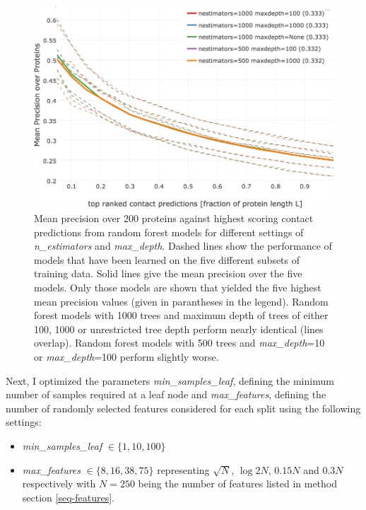 \documentclass[11pt,a4paper,twoside]{book}
\providecommand{\tightlist}{%
  \setlength{\itemsep}{0pt}\setlength{\parskip}{0pt}}
\theoremstyle{definition}
\theoremstyle{definition}
\theoremstyle{remark}
\begin{document}
\begin{figure}

{\centering \includegraphics[width=1\linewidth]{img/random_forest_contact_prior/new_gridsearch/precision_vs_rank_cv_on_test_random_forest_nestimators_maxdepth_top5_notitle} 

}

\caption{Mean precision over
200 proteins against highest scoring contact predictions from random
forest models for different settings of \emph{n\_estimators} and
\emph{max\_depth}. Dashed lines show the performance of models that have
been learned on the five different subsets of training data. Solid lines
give the mean precision over the five models. Only those models are
shown that yielded the five highest mean precision values (given in
parantheses in the legend). Random forest models with 1000 trees and
maximum depth of trees of either 100, 1000 or unrestricted tree depth
perform nearly identical (lines overlap). Random forest models with 500
trees and \emph{max\_depth}=10 or \emph{max\_depth}=100 perform slightly
worse.}\label{fig:rf-gridsearch-nestimators-maxfeatures}
\end{figure}

Next, I optimized the parameters \emph{min\_samples\_leaf}, defining the
minimum number of samples required at a leaf node and
\emph{max\_features}, defining the number of randomly selected features
considered for each split using the following settings:

\begin{itemize}
\tightlist
\item
  \emph{min\_samples\_leaf} \(\in \{1, 10, 100\}\)
\item
  \emph{max\_features} \(\in \{8, 16, 38, 75 \}\) representing
  \(\sqrt{N}\), \(\log2{N}\), \(0.15N\) and \(0.3N\) respectively with
  \(N=250\) being the number of features listed in method section
  \ref{seq-features}.
\end{itemize}
\end{document}
